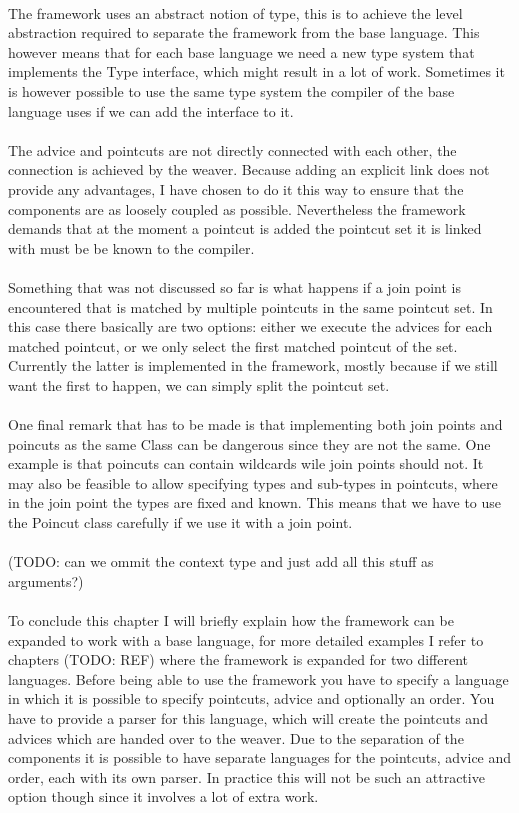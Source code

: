 \documentclass[a4paper]{report}
\begin{document}
\\
The framework uses an abstract notion of type, this is to achieve the level abstraction required to separate the framework from the base language. This however means that for each base language we need a new type system that implements the Type interface, which might result in a lot of work. Sometimes it is however possible to use the same type system the compiler of the base language uses if we can add the interface to it.\\
\\
The advice and pointcuts are not directly connected with each other, the connection is achieved by the weaver. Because adding an explicit link does not provide any advantages, I have chosen to do it this way to ensure that the components are as loosely coupled as possible. Nevertheless the framework demands that at the moment a pointcut is added the pointcut set it is linked with must be be known to the compiler.\\
\\
Something that was not discussed so far is what happens if a join point is encountered that is matched by multiple pointcuts in the same pointcut set. In this case there basically are two options: either we execute the advices for each matched pointcut, or we only select the first matched pointcut of the set. Currently the latter is implemented in the framework, mostly because if we still want the first to happen, we can simply split the pointcut set.\\
\\
One final remark that has to be made is that implementing both join points and poincuts as the same Class can be dangerous since they are not the same. One example is that poincuts can contain wildcards wile join points should not. It may also be feasible to allow specifying types and sub-types in pointcuts, where in the join point the types are fixed and known. This means that we have to use the Poincut class carefully if we use it with a join point.\\
\\
(TODO: can we ommit the context type and just add all this stuff as arguments?)\\
\\
To conclude this chapter I will briefly explain how the framework can be expanded to work with a base language, for more detailed examples I refer to chapters (TODO: REF) where the framework is expanded for two different languages. Before being able to use the framework you have to specify a language in which it is possible to specify pointcuts, advice and optionally an order. You have to provide a parser for this language, which will create the pointcuts and advices which are handed over to the weaver. Due to the separation of the components it is possible to have separate languages for the pointcuts, advice and order, each with its own parser. In practice this will not be such an attractive option though since it involves a lot of extra work.\\
\end{document}
